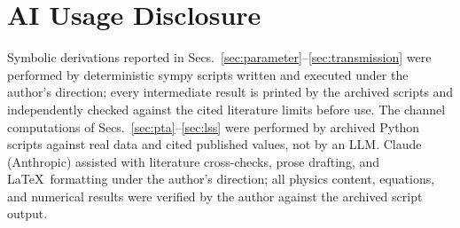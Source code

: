 \documentclass[aps,prd,twocolumn,superscriptaddress,nofootinbib,longbibliography]{revtex4-2}
\begin{document}
\section*{AI Usage Disclosure}
Symbolic derivations reported in Secs.~\ref{sec:parameter}--\ref{sec:transmission}
were performed by deterministic sympy scripts written and executed under the
author's direction; every intermediate result is printed by the archived
scripts and independently checked against the cited literature limits before
use. The channel computations of Secs.~\ref{sec:pta}--\ref{sec:lss} were
performed by archived Python scripts against real data and cited published
values, not by an LLM. Claude (Anthropic) assisted with literature cross-checks,
prose drafting, and \LaTeX\ formatting under the author's direction; all
physics content, equations, and numerical results were verified by the author
against the archived script output.
\end{document}
